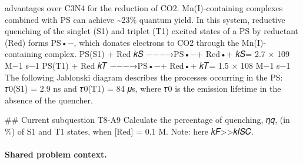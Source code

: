 advantages over C3N4 for the reduction of CO2. Mn(I)-containing complexes combined with PS can achieve \textasciitilde{}23\% quantum yield. In this system, reductive quenching of the singlet (S1) and triplet (T1) excited states of a PS by reductant (Red) forms PS•−, which donates electrons to CO2 through the Mn(I)-containing complex. PS(S1) + Red 𝑘𝑆 −−−→PS•−+ Red•+ 𝑘𝑆= 2.7 × 109 M−1 s−1 PS(T1) + Red 𝑘𝑇 −−−→PS•−+ Red•+ 𝑘𝑇= 1.5 × 108 M−1 s−1 The following Jablonski diagram describes the processes occurring in the PS: 𝜏0(S1) = 2.9 ns and 𝜏0(T1) = 84 𝜇s, where 𝜏0 is the emission lifetime in the absence of the quencher.

\#\# Current subquestion T8-A9
Calculate the percentage of quenching, 𝜂𝑞, (in \%) of S1 and T1 states, when [Red] = 0.1 M. Note: here 𝑘𝐹>>𝑘𝐼𝑆𝐶.

\paragraph{Shared problem context.}

